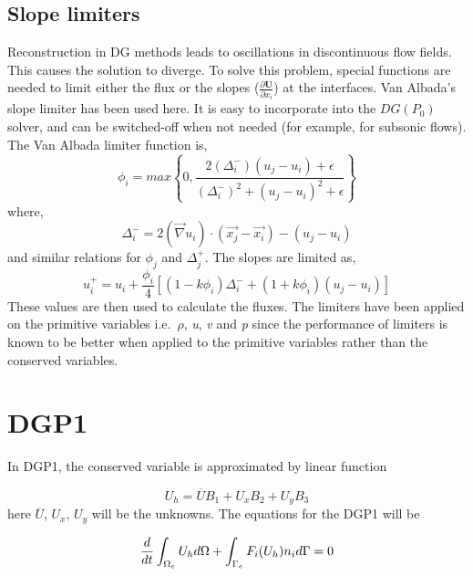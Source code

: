 \documentclass[12pt]{elsarticle}
\begin{document}
	\subsection{Slope limiters}
	Reconstruction in DG methods leads to oscillations in discontinuous flow fields. This causes the solution to diverge. To solve this problem, special functions are needed to limit either the flux or the slopes ($\frac{\partial \mathbf{U}}{\partial x_i}$) at the interfaces. Van Albada's slope limiter has been used here. It is easy to incorporate into the $DG(P_0)$ solver, and can be switched-off when not needed (for example, for subsonic flows). The Van Albada limiter function is,
	\begin{equation}
		\phi_i = max\left\lbrace 0, \frac{2(\Delta^-_i) (u_j - u_i)+\epsilon}{(\Delta^-_i)^2 + (u_j - u_i)^2+\epsilon} \right\rbrace
	\end{equation}
	where,
	\begin{equation}
		\Delta^-_i = 2(\vec\nabla u_i) \cdot (\overrightarrow{x_j} - \overrightarrow{x_i}) - (u_j - u_i)
	\end{equation}
	and similar relations for $\phi_j$ and $\Delta^+_j$. The slopes are limited as,
	\begin{equation}
		u^+_i = u_i + \frac{\phi_i}{4} \left[(1-k\phi_i)\Delta^-_i + (1+k\phi_i)(u_j - u_i)\right]
	\end{equation}
	These values are then used to calculate the fluxes.
	The limiters have been applied on the primitive variables i.e.\ $\rho$, \textit{u}, \textit{v} and \textit{p} since the performance of limiters is known to be better when applied to the primitive variables rather than the conserved variables.
	
	\section{DGP1}
	In DGP1, the conserved variable is approximated by linear function
	
	\begin{equation}
		U_h=\overline{U}B_1+U_xB_2+U_y B_3
	\end{equation}
	here $\overline{U}$, $U_x$, $U_y$ will be the unknowns. The equations for the DGP1 will be
	
	\begin{equation}
		\frac{d}{d t} \int_{\Omega_e} U_h d\Omega + \int_{\Gamma_e} F_i(U_h) n_i d\Gamma=0\\
	\end{equation}
	
\end{document}

